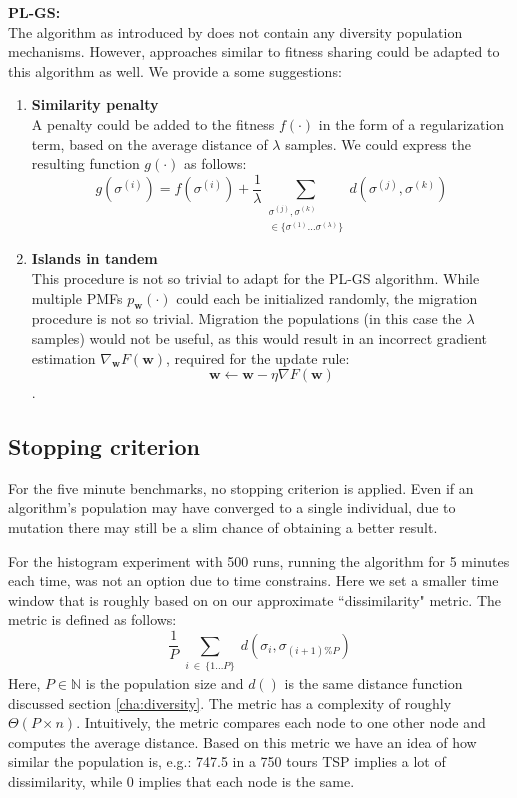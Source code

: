 \documentclass[a4paper,10pt]{article}
\begin{document}
	\textbf{PL-GS:} \\
	The algorithm as introduced by \citeauthor{santucci_gradient_2020} does not contain any diversity population mechanisms. However, approaches similar to fitness sharing could be adapted to this algorithm as well. We provide a some suggestions:
	\begin{enumerate}
		\item \textbf{Similarity penalty} \\ 
		A penalty could be added to the fitness $f(\cdot)$ in the form of a regularization term, based on the average distance of $\lambda$ samples. We could express the resulting function $g(\cdot)$ as follows:
		$$
		g(\sigma^{(i)}) = f(\sigma^{(i)}) + \frac{1}{\lambda} \sum_{\substack{\sigma^{(j)}, \sigma^{(k)} \\ \in \{ \sigma^{(1)} \dots \sigma^{(\lambda)} \}}} d(\sigma^{(j)}, \sigma^{(k)})
		$$
		\item \textbf{Islands in tandem} \\
		This procedure is not so trivial to adapt for the PL-GS algorithm. While multiple PMFs $p_\mathbf{w}(\cdot)$ could each be initialized randomly, the migration procedure is not so trivial. Migration the populations (in this case the $\lambda$ samples) would not be useful, as this would result in an incorrect gradient estimation $\nabla_{\mathbf{w}} F\left(\mathbf{w}\right)$, required for the update rule:
		$$\mathbf{w} \leftarrow \mathbf{w} - \eta \nabla F\left(\mathbf{w}\right)$$.
		
		
	\end{enumerate}
	


\subsection{Stopping criterion}
For the five minute benchmarks, no stopping criterion is applied. Even if an algorithm's population may have converged to a single individual, due to mutation there may still be a slim chance of obtaining a better result. 

For the histogram experiment with 500 runs, running the algorithm for 5 minutes each time, was not an option due to time constrains. Here we set a smaller time window that is roughly based on on our approximate ``dissimilarity" metric. The metric is defined as follows:
$$
\frac{1}{P} \sum_{\substack{i~\in~\{1 \dots P \}}} d(\sigma_i, \sigma_{(i+1) \% P})
$$
Here, $P \in \mathbb{N}$ is the population size and $d()$ is the same distance function discussed section \ref{cha:diversity}. The metric has a complexity of roughly $\Theta(P \times n)$.
Intuitively, the metric compares each node to one other node and computes the average distance. Based on this metric we have an idea of how similar the population is, e.g.: 747.5 in a 750 tours TSP implies a lot of dissimilarity, while 0 implies that each node is the same.
\end{document}
